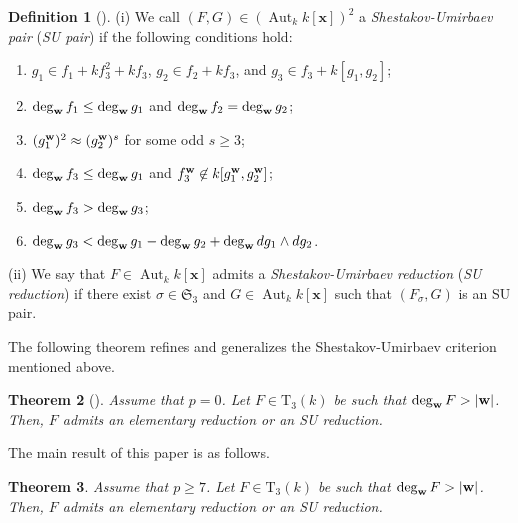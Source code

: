 \documentclass{amsart}
\theoremstyle{plain}
\newtheorem{thm}{Theorem}[section]
\theoremstyle{definition}
\newtheorem{definition}[thm]{Definition}
\newcommand{\Aut }{\mathop{\mathrm{Aut}}\nolimits}
\newcommand{\T }{\mathrm{T}}
\newcommand{\nd}{\noindent}
\newcommand{\x}{{\boldsymbol x}}
\newcommand{\w}{{\bf w}}
\newcommand{\kx}{k[\x]}
\newcommand{\sym}{\mathfrak{S}}
\begin{document}
\begin{definition}[{\cite{tame3}}]\label{defn:SUC}\rm
(i) We call $(F,G)\in (\Aut _k\kx )^2$ 
a {\it Shestakov-Umirbaev pair} 
({\it SU pair}) 
if the following conditions hold: 


\renewcommand{\theenumi}{\roman{enumi}}

\nd 
\begin{enumerate}[leftmargin=12mm]

\item [(SU1)]
$g_1\in f_1+kf_3^2+kf_3$, 
$g_2\in f_2+kf_3$, and $g_3\in f_3+k[g_1,g_2]$; 

\item [(SU2)] $\deg _{\w }f_1\leq \deg _{\w }g_1$ 
and $\deg _{\w }f_2=\deg _{\w }g_2$; 

\item [(SU3)] $(g_1^{\w })^2\approx (g_2^{\w })^s$ 
for some odd $s\geq 3$; 

\item [(SU4)] $\deg _{\w }f_3\leq \deg _{\w }g_1$ 
and $f_3^{\w }\not\in k[g_1^{\w }, g_2^{\w }]$; 

\item [(SU5)] 
$\deg _{\w }f_3>\deg _{\w }g_3$; 

\item [(SU6)] 
$\deg _{\w }g_3<\deg _{\w }g_1-\deg _{\w }g_2 
+\deg _{\w }dg_1\wedge dg_2$. 

\end{enumerate}



\nd (ii) 
We say that $F\in \Aut _k\kx $ admits a 
{\it Shestakov-Umirbaev reduction} 
({\it SU reduction}) 
if there exist $\sigma \in \sym _3$ and $G\in \Aut _k\kx $ such that 
$(F_{\sigma },G)$ is an SU pair. 
\end{definition}



The following theorem refines and generalizes 
the Shestakov-Umirbaev criterion \cite[Theorem~1]{SU} 
mentioned above. 


\begin{thm}[{\cite[Theorem 2.1]{tame3}}]\label{thm:ptame3}
Assume that $p=0$. 
Let $F\in \T _3(k)$ be such that $\deg _{\w }F>|\w |$. 
Then, $F$ admits an elementary reduction or an SU reduction. 
\end{thm}



The main result of this paper is as follows. 


\begin{thm}\label{thm:mainSU}
Assume that $p\ge 7$. 
Let $F\in \T _3(k)$ be such that $\deg _{\w }F>|\w |$. 
Then, $F$ admits an elementary reduction or 
an SU reduction. 
\end{thm}
\end{document}
